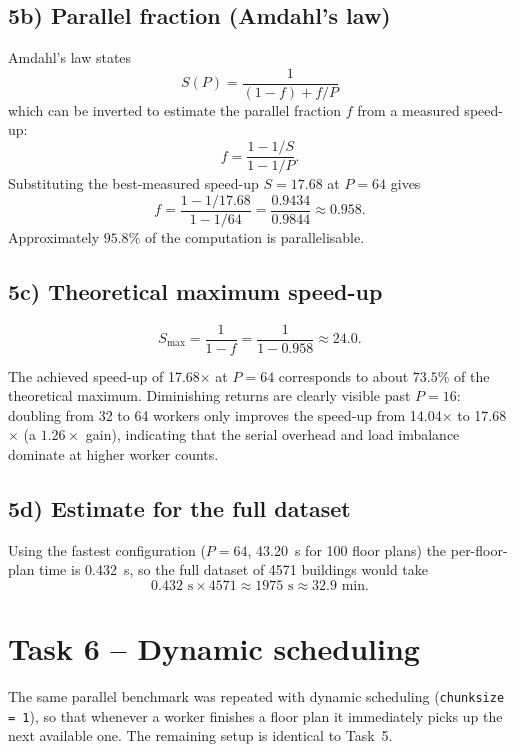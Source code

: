 \documentclass[11pt,a4paper]{article}
\begin{document}
\subsection*{5b) Parallel fraction (Amdahl's law)}

Amdahl's law states
\[
    S(P) = \frac{1}{(1-f) + f/P}
\]
which can be inverted to estimate the parallel fraction \(f\) from a measured
speed-up:
\[
    f = \frac{1 - 1/S}{1 - 1/P}.
\]
Substituting the best-measured speed-up \(S = 17.68\) at \(P = 64\) gives
\[
    f = \frac{1 - 1/17.68}{1 - 1/64} = \frac{0.9434}{0.9844} \approx 0.958.
\]
Approximately \(\mathbf{95.8\%}\) of the computation is parallelisable.

\subsection*{5c) Theoretical maximum speed-up}

\[
    S_\text{max} = \frac{1}{1 - f} = \frac{1}{1 - 0.958} \approx 24.0.
\]

The achieved speed-up of 17.68\(\times\) at \(P = 64\) corresponds to about
\(\mathbf{73.5\%}\) of the theoretical maximum. Diminishing returns are clearly
visible past \(P = 16\): doubling from 32 to 64 workers only improves the
speed-up from 14.04\(\times\) to 17.68\(\times\) (a \(1.26\times\) gain),
indicating that the serial overhead and load imbalance dominate at higher worker
counts.

\subsection*{5d) Estimate for the full dataset}

Using the fastest configuration (\(P = 64\), \SI{43.20}{\second} for 100 floor
plans) the per-floor-plan time is \SI{0.432}{\second}, so the full dataset of
4571 buildings would take
\[
    0.432 \text{ s} \times 4571 \approx 1975 \text{ s} \approx 32.9 \text{ min}.
\]

\section{Task 6 -- Dynamic scheduling}

The same parallel benchmark was repeated with dynamic scheduling
(\texttt{chunksize = 1}), so that whenever a worker finishes a floor plan it
immediately picks up the next available one. The remaining setup is identical
to Task~5.
\end{document}
